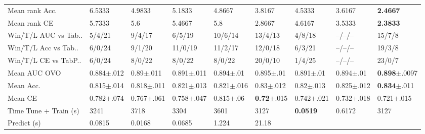 \begin{tabular}{@{\hskip 0mm}
l@{\hskip 1mm}
l@{\hskip 1mm}
l@{\hskip 1mm}
l@{\hskip 1mm}
l@{\hskip 1mm}
l@{\hskip 1mm}
l@{\hskip 1mm}
l@{\hskip 1mm}
l@{\hskip 0mm}}
Mean rank Acc.       &          6.5333 &          4.9833 &           5.1833 &           4.8667 &                  3.8167 &           4.5333 &           3.6167 &           \textbf{2.4667} \\
Mean rank CE         &          5.7333 &             5.6 &           5.4667 &              5.8 &                  2.8667 &           4.6167 &           3.5333 &           \textbf{2.3833} \\
\midrule
Win/T/L AUC
                             vs Tab.. &          5/4/21 &          9/4/17 &           6/5/19 &          10/6/14 &                 13/4/13 &           4/8/18 &            --/--/-- &                    15/7/8 \\
Win/T/L Acc vs Tab.. &          6/0/24 &          9/1/20 &          11/0/19 &          11/2/17 &                 12/0/18 &           6/3/21 &            --/--/-- &                    19/3/8 \\
Win/T/L CE vs TabP.. &          6/0/24 &          8/0/22 &           8/0/22 &           8/0/22 &                 20/0/10 &           1/4/25 &            --/--/-- &                    23/0/7 \\
\midrule
Mean AUC OVO
                                         &  0.884$\pm$.012 &   0.89$\pm$.011 &   0.891$\pm$.011 &    0.894$\pm$.01 &           0.895$\pm$.01 &    0.891$\pm$.01 &    0.894$\pm$.01 &  \textbf{0.898}$\pm$.0097 \\
Mean Acc.            &  0.815$\pm$.014 &  0.818$\pm$.011 &   0.821$\pm$.013 &   0.821$\pm$.016 &           0.83$\pm$.012 &    0.82$\pm$.013 &   0.825$\pm$.012 &   \textbf{0.834}$\pm$.011 \\
Mean CE              &  0.782$\pm$.074 &  0.767$\pm$.061 &   0.758$\pm$.047 &    0.815$\pm$.06 &  \textbf{0.72}$\pm$.015 &   0.742$\pm$.021 &   0.732$\pm$.018 &            0.721$\pm$.015 \\
\midrule
Time Tune + Train (s) 
                                    &            3241 &            3718 &             3304 &             3601 &                    3127 &  \multirow{2}{*}{\textbf{0.0519}} &           \multirow{2}{*}{0.6172} &                      \multirow{2}{*}{3127} \\
Predict (s)  &  0.0815 & 0.0168 & 0.0685 & 1.224 & 21.18 &  &  &  \\
\bottomrule
\end{tabular}